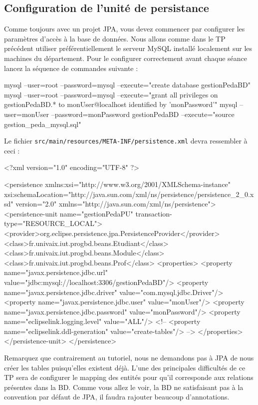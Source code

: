\documentclass[a4paper,11pt]{article}
\begin{document}
\subsection{Configuration de l'unité de persistance}
Comme toujours avec un projet JPA, vous devez commencer par configurer les paramètres d'accès à la base de données.
Nous allons comme dans le TP précédent utiliser préférentiellement le serveur MySQL installé localement sur les machines 
du département. Pour le configurer correctement avant chaque séance lancez la séquence de commandes suivante :
\begin{code_shell}
mysql --user=root --password=mysql --execute="create database gestionPedaBD"
mysql --user=root --password=mysql --execute="grant all privileges on gestionPedaBD.* to monUser@localhost identified by 'monPassword'"
mysql --user=monUser --password=monPassword gestionPedaBD --execute="source gestion_peda_mysql.sql"
\end{code_shell}

Le fichier \texttt{src/main/resources/META-INF/persistence.xml} devra ressembler à ceci :
\begin{code_xml}
<?xml version="1.0" encoding="UTF-8" ?>

<persistence xmlns:xsi="http://www.w3.org/2001/XMLSchema-instance" 
  xsi:schemaLocation="http://java.sun.com/xml/ns/persistence/persistence_2_0.xsd" 
  version="2.0" xmlns="http://java.sun.com/xml/ns/persistence">
  <persistence-unit name="gestionPedaPU" transaction-type="RESOURCE_LOCAL">
    <provider>org.eclipse.persistence.jpa.PersistenceProvider</provider>
	<class>fr.univaix.iut.progbd.beans.Etudiant</class>
	<class>fr.univaix.iut.progbd.beans.Module</class>
	<class>fr.univaix.iut.progbd.beans.Prof</class>
    <properties>
      <property name="javax.persistence.jdbc.url" value="jdbc:mysql://localhost:3306/gestionPedaBD"/>
      <property name="javax.persistence.jdbc.driver" value="com.mysql.jdbc.Driver"/>
      <property name="javax.persistence.jdbc.user"  value="monUser"/>
      <property name="javax.persistence.jdbc.password"  value="monPassword"/>
      <property name="eclipselink.logging.level" value="ALL"/>
<!--  <property name="eclipselink.ddl-generation"  value="create-tables"/> -->
    </properties>
  </persistence-unit>
</persistence>
\end{code_xml}
Remarquez que contrairement au tutoriel, nous ne demandons pas à JPA de nous créer les tables puisqu'elles existent déjà.
L'une des principales difficultés de ce TP sera de configurer le mapping des entités pour qu'il corresponde aux relations 
présentes dans la BD. Comme vous allez le voir, la BD ne satisfaisant pas à la convention par défaut de JPA,
il faudra rajouter beaucoup d'annotations.
\end{document}
